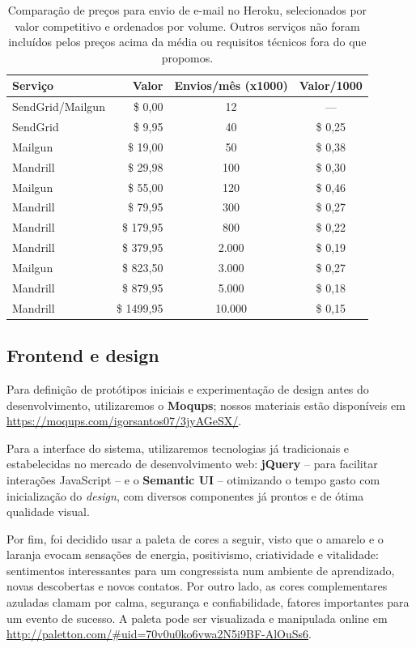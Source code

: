 \documentclass[12pt,a4paper,twoside,hyphens,english,brazil]{abntex2}
\begin{document}
{\begin{table}[h]
	\caption[Comparação de preços para envio de e-mail no Heroku]{Comparação de preços para envio de e-mail no Heroku, selecionados por valor competitivo e ordenados por volume. Outros serviços não foram incluídos pelos preços acima da média ou requisitos técnicos fora do que propomos.}
	\centering
	\begin{tabular}{|l|r|c|c|}
		\hline \textbf{Serviço}	& \textbf{Valor} & \textbf{Envios/mês} (x1000) & \textbf{Valor/1000} \\ 
		\hline SendGrid/Mailgun	& \$    0,00 &     12 &     --- \\ 
		\hline SendGrid			& \$    9,95 &     40 & \$ 0,25 \\ 
		\hline Mailgun			& \$   19,00 &     50 & \$ 0,38 \\ 
		\hline Mandrill			& \$   29,98 &    100 & \$ 0,30 \\ 
		\hline Mailgun			& \$   55,00 &    120 & \$ 0,46 \\ 
		\hline Mandrill			& \$   79,95 &    300 & \$ 0,27 \\ 
		\hline Mandrill			& \$  179,95 &    800 & \$ 0,22 \\ 
		\hline Mandrill			& \$  379,95 &  2.000 & \$ 0,19 \\ 
		\hline Mailgun			& \$  823,50 &  3.000 & \$ 0,27 \\ 
		\hline Mandrill			& \$  879,95 &  5.000 & \$ 0,18 \\ 
		\hline Mandrill			& \$ 1499,95 & 10.000 & \$ 0,15 \\ 
		\hline 
	\end{tabular} 
\end{table}

\subsection{Frontend e design}
Para definição de protótipos iniciais e experimentação de design antes do desenvolvimento, utilizaremos o \textbf{Moqups}; nossos materiais estão disponíveis em \url{https://moqups.com/igorsantos07/3jyAGeSX/}.

Para a interface do sistema, utilizaremos tecnologias já tradicionais e estabelecidas no mercado de desenvolvimento web: \textbf{jQuery} -- para facilitar interações JavaScript -- e o \textbf{Semantic UI} -- otimizando o tempo gasto com inicialização do \emph{design}, com diversos componentes já prontos e de ótima qualidade visual.

Por fim, foi decidido usar a paleta de cores a seguir, visto que o amarelo e o laranja evocam sensações de energia, positivismo, criatividade e vitalidade: sentimentos interessantes para um congressista num ambiente de aprendizado, novas descobertas e novos contatos. Por outro lado, as cores complementares azuladas clamam por calma, segurança e confiabilidade, fatores importantes para um evento de sucesso. A paleta pode ser visualizada e manipulada online em \url{http://paletton.com/#uid=70v0u0ko6vwa2N5i9BF-AlOuSs6}.\cite{colors-marketo}\cite{colors-creative}

}
\end{document}
